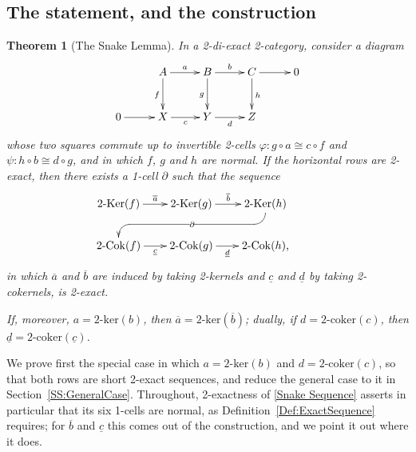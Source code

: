 \documentclass[reqno,a4paper]{amsart}
\numberwithin{equation}{section}
\theoremstyle{plain}
\newtheorem{theorem}[subsection]{Theorem}
\theoremstyle{definition}
\def\nameit#1{\textrm{#1}~}
\def\defx{\nameit{Definition}}
\newcommand{\comp}{\circ}
\newcommand{\iso}{\cong}
\newcommand{\ov}[1]{\overline{#1}}
\def\phi{\varphi}
\renewcommand{\1}{\onecat{1}}
\newcommand{\TwoKer}{\ensuremath{2\text{-}\mathrm{Ker}}}
\newcommand{\TwoCoker}{\ensuremath{2\text{-}\mathrm{Cok}}}
\newcommand{\twoker}{\ensuremath{2\text{-}\mathrm{ker}}}
\newcommand{\twocoker}{\ensuremath{2\text{-}\mathrm{coker}}}
\begin{document}
\subsection{The statement, and the construction}\label{SS:Construction}

\begin{theorem}[The Snake Lemma]\label{Snake General 2D}
	In a 2-di-exact 2-category, consider a diagram
	\begin{equation}\label{Snake Ladder}
		\xymatrix@!0@=4em{
		& A \ar[d]_{f} \ar[r]^-{a} &
		B \ar[d]_{g} \ar[r]^-{b} &
		C \ar[d]^{h} \ar[r] &
		0 \\
		0 \ar[r] &
		X \ar[r]_-{c} &
		Y \ar[r]_-{d} &
		Z}
	\end{equation}
	whose two squares commute up to invertible 2-cells \(\phi\colon g\comp a\iso c\comp f\) and \(\psi\colon h\comp b\iso d\comp g\), and in which \(f\), \(g\) and \(h\) are normal. If the horizontal rows are 2-exact, then there exists a 1-cell \(\partial\) such that the sequence
	\begin{equation}\label{Snake Sequence}
		\xymatrix@R=5ex@C=2em{
		\TwoKer({f}) \ar[r]^-{\ov{a}} &
		\TwoKer({g}) \ar[r]^-{\ov{b}} &
		\TwoKer({h}) \ar `d[l] `[dll]|-{\partial} [dll] &\\
		\TwoCoker({f}) \ar[r]_-{\underline{c}} &
		\TwoCoker({g}) \ar[r]_-{\underline{d}} &
		\TwoCoker({h})\text{,}
		}
	\end{equation}
	in which \(\ov{a}\) and \(\ov{b}\) are induced by taking 2-kernels and \(\underline{c}\) and \(\underline{d}\) by taking 2-cokernels, is 2-exact.

	If, moreover, \(a=\twoker(b)\), then \(\ov{a}=\twoker(\ov{b})\); dually, if \(d=\twocoker(c)\), then \(\underline{d}=\twocoker(\underline{c})\).
\end{theorem}

We prove first the special case in which \(a=\twoker(b)\) and \(d=\twocoker(c)\), so that both rows are short 2-exact sequences, and reduce the general case to it in Section~\ref{SS:GeneralCase}. Throughout, 2-exactness of \eqref{Snake Sequence} asserts in particular that its six 1-cells are normal, as \defx\ref{Def:ExactSequence} requires; for \(\ov{b}\) and \(\underline{c}\) this comes out of the construction, and we point it out where it does.
\end{document}

